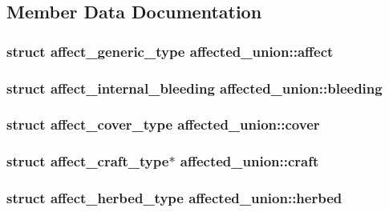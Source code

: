 \subsection{Member Data Documentation}
\hypertarget{unionaffected__union_adb59b2f1681ae8bc3b1ca089e39dd3a0}{
\subsubsection[{affect}]{\setlength{\rightskip}{0pt plus 5cm}struct {\bf affect\-\_\-generic\-\_\-type} affected\-\_\-union\-::affect}}\label{unionaffected__union_adb59b2f1681ae8bc3b1ca089e39dd3a0}
\hypertarget{unionaffected__union_a496df11695c06bebacd5707d3fc6d559}{
\subsubsection[{bleeding}]{\setlength{\rightskip}{0pt plus 5cm}struct {\bf affect\-\_\-internal\-\_\-bleeding} affected\-\_\-union\-::bleeding}}\label{unionaffected__union_a496df11695c06bebacd5707d3fc6d559}
\hypertarget{unionaffected__union_ad30fcc11880dc283492490b4ec44f5a8}{
\subsubsection[{cover}]{\setlength{\rightskip}{0pt plus 5cm}struct {\bf affect\-\_\-cover\-\_\-type} affected\-\_\-union\-::cover}}\label{unionaffected__union_ad30fcc11880dc283492490b4ec44f5a8}
\hypertarget{unionaffected__union_a0d3cb515a6284521abc165642308d329}{
\subsubsection[{craft}]{\setlength{\rightskip}{0pt plus 5cm}struct {\bf affect\-\_\-craft\-\_\-type}$\ast$ affected\-\_\-union\-::craft}}\label{unionaffected__union_a0d3cb515a6284521abc165642308d329}
\hypertarget{unionaffected__union_a55f74c011521f3f0a0aaa8d29e48716e}{
\subsubsection[{herbed}]{\setlength{\rightskip}{0pt plus 5cm}struct {\bf affect\-\_\-herbed\-\_\-type} affected\-\_\-union\-::herbed}}\label{unionaffected__union_a55f74c011521f3f0a0aaa8d29e48716e}
